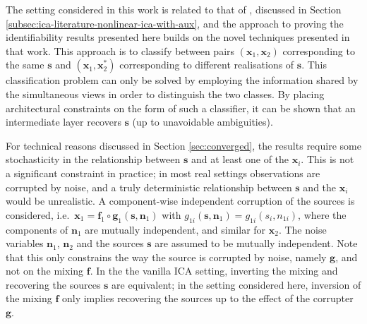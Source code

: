 
The setting considered in this work is related to that of \cite{hyvarinen19a}, discussed in Section \ref{subsec:ica-literature-nonlinear-ica-with-aux},
and the approach to proving the identifiability results presented here builds on the novel techniques presented in that work.
This approach 
is to classify between pairs $(\bm{x}_1, \bm{x}_2)$ corresponding to the same $\bm{s}$ and $(\bm{x}_1, \bm{x}^*_2)$ corresponding to different realisations of $\bm{s}$.
This classification problem can only be solved by employing the information shared by the simultaneous views in order to distinguish the two classes.
By placing architectural constraints on the form of such a classifier, it can be shown that an intermediate layer recovers $\bm{s}$ (up to unavoidable ambiguities).

For technical reasons discussed in Section
\ref{sec:converged}, the results require some stochasticity in the relationship between $\bm{s}$ and at least one of the $\bm{x}_i$.
This is not a significant constraint in practice; in most real settings observations are corrupted by noise, and a truly deterministic relationship between $\bm{s}$ and the $\bm{x}_i$ would be unrealistic.
A component-wise independent corruption of the sources is considered, i.e.~$\bm{x}_1 = \bm{f}_1 \circ \bm{g}_1(\bm{s}, \bm{n}_1)$ with $g_{1i}(\bm{s}, \bm{n}_1) = g_{1i}(s_i, n_{1i})$, where the components of $\bm{n}_{1}$ are mutually independent, and similar for $\bm{x}_2$. The noise variables $\bm{n}_1$, $\bm{n}_2$ and the sources $\bm{s}$ are assumed to be mutually independent.
Note that this only constrains the way the source is corrupted by noise, namely $\bm{g}$, and not on the mixing $\bm{f}$.
In the the vanilla ICA setting, inverting the mixing and recovering the sources $\bm{s}$ are equivalent; in the setting considered here, inversion of the mixing $\bm{f}$ only implies recovering the sources up to the effect of the corrupter $\bm{g}$.

